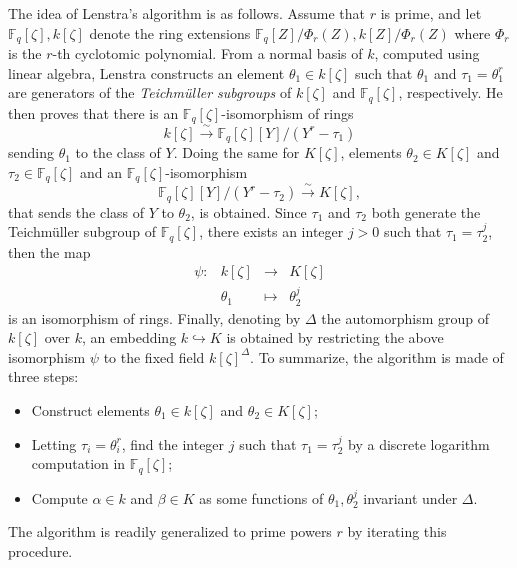 \documentclass{mcom-l}
\theoremstyle{plain}
\theoremstyle{definition}
\newcommand{\F}{\ensuremath{\mathbb{F}}}
\newcounter{algorithm}
\begin{document}
The idea of Lenstra's algorithm is as follows.  Assume that $r$ is prime, and let $\F_q[\zeta], 
k[\zeta]$ denote the ring extensions $\F_q[Z] / \Phi_r(Z), k[Z] / \Phi_r(Z)$ where $\Phi_r$ is the 
$r$-th cyclotomic polynomial. From a normal basis of $k$, computed using linear algebra, Lenstra 
constructs an element $\theta_1 \in k[\zeta]$ such that $\theta_1$ and $\tau_1 = \theta_1^r$ are 
generators of the \textit{Teichm\"uller subgroups} of $k[\zeta]$ and $\F_q[\zeta]$, respectively. 
He then proves that there is an $\F_q[\zeta]$-isomorphism of rings
\[ k[\zeta] \xrightarrow{\sim} \F_q[\zeta][Y]/(Y^r - \tau_1) \]
sending $\theta_1$ to the class of $Y$. Doing the same for 
$K[\zeta]$, elements $\theta_2 \in K[\zeta]$ and $\tau_2 \in \F_q[\zeta]$ and an 
$\F_q[\zeta]$-isomorphism
\[ \F_q[\zeta][Y]/(Y^r - \tau_2) \xrightarrow{\sim} K[\zeta], \]
that sends the class of $Y$ to $\theta_2$, is obtained.
Since $\tau_1$ and $\tau_2$ both generate the Teichm\"uller subgroup of $\F_q[\zeta]$,
there exists an integer $j > 0$ such that $\tau_1=\tau_2^j$, then the map
\[
\begin{array}{lrll}
	\psi: & k[\zeta] & \rightarrow & K[\zeta] \\
	& \theta_1 & \mapsto & \theta_2^j
\end{array}
\]
is an isomorphism of rings. Finally, denoting by $\Delta$ the automorphism group of $k[\zeta]$
over $k$, an embedding $k \hookrightarrow K$ is obtained by restricting the above isomorphism 
$\psi$ to the fixed field $k[\zeta]^\Delta$. To summarize, the algorithm is made of three steps:
\begin{itemize}
	\item Construct elements $\theta_1\in k[\zeta]$ and $\theta_2\in K[\zeta]$;
	\item Letting $\tau_i=\theta_i^r$, find the integer $j$ such that
	  $\tau_1=\tau_2^j$ by a discrete logarithm computation in
	  $\F_q[\zeta]$;
	\item Compute $\alpha\in k$ and $\beta\in K$ as some functions of
	  $\theta_1,\theta_2^j$ invariant under $\Delta$.
\end{itemize}
The algorithm is readily generalized to prime powers $r$ by iterating this procedure.
\end{document}
